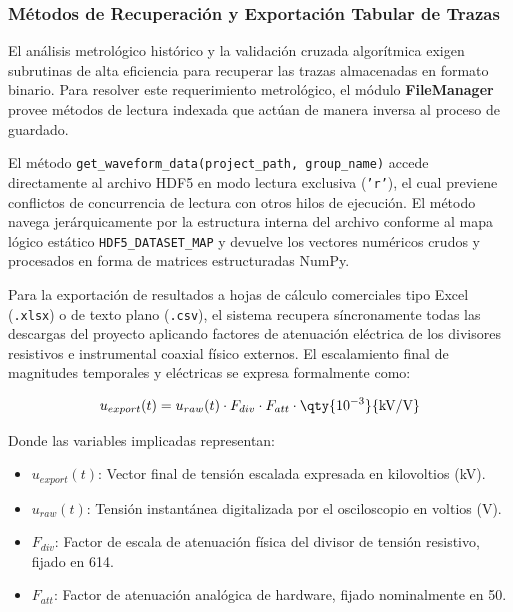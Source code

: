 \subsubsection{Métodos de Recuperación y Exportación Tabular de Trazas}
\label{subsubsec:recuperacion_exportacion_trazas}

El análisis metrológico histórico y la validación cruzada algorítmica exigen subrutinas de alta eficiencia para recuperar las trazas almacenadas en formato binario. Para resolver este requerimiento metrológico, el módulo \textbf{FileManager} provee métodos de lectura indexada que actúan de manera inversa al proceso de guardado.

El método \texttt{get\_waveform\_data(project\_path, group\_name)} accede directamente al archivo HDF5 en modo lectura exclusiva (\texttt{'r'}), el cual previene conflictos de concurrencia de lectura con otros hilos de ejecución. El método navega jerárquicamente por la estructura interna del archivo conforme al mapa lógico estático \texttt{HDF5\_DATASET\_MAP} y devuelve los vectores numéricos crudos y procesados en forma de matrices estructuradas NumPy.

Para la exportación de resultados a hojas de cálculo comerciales tipo Excel (\texttt{.xlsx}) o de texto plano (\texttt{.csv}), el sistema recupera síncronamente todas las descargas del proyecto aplicando factores de atenuación eléctrica de los divisores resistivos e instrumental coaxial físico externos. El escalamiento final de magnitudes temporales y eléctricas se expresa formalmente como:

\begin{equation}
\label{eq:escalado_final_export}
u_{export}(t) = u_{raw}(t) \cdot F_{div} \cdot F_{att} \cdot \qty{10^{-3}}{\text{kV/V}}
\end{equation}

Donde las variables implicadas representan:
\begin{itemize}
    \item $u_{export}(t)$: Vector final de tensión escalada expresada en kilovoltios (\unit{\kilo\volt}).
    \item $u_{raw}(t)$: Tensión instantánea digitalizada por el osciloscopio en voltios (\unit{\volt}).
    \item $F_{div}$: Factor de escala de atenuación física del divisor de tensión resistivo, fijado en \num{614}.
    \item $F_{att}$: Factor de atenuación analógica de hardware, fijado nominalmente en \num{50}.
\end{itemize}


